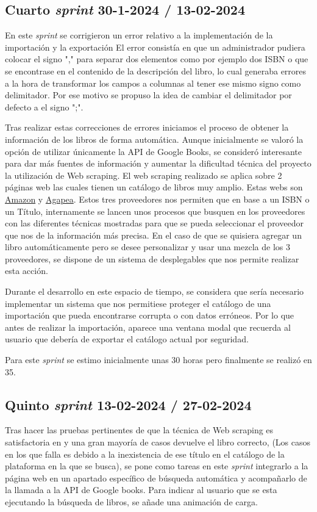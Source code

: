 \subsection{Cuarto \textit{sprint} 30-1-2024 / 13-02-2024}
En este \textit{sprint} se corrigieron un error relativo a la implementación de la importación y la exportación
El error consistía en que un administrador pudiera colocar el signo "," para separar dos elementos como por ejemplo dos ISBN o que se encontrase en el contenido de la descripción del libro, lo cual generaba errores a la hora de transformar los campos a columnas al tener ese mismo signo como delimitador. Por ese motivo se propuso la idea de cambiar el delimitador por defecto a el signo ";".

Tras realizar estas correcciones de errores iniciamos el proceso de obtener la información  de los libros de forma automática. Aunque inicialmente se valoró la opción de utilizar únicamente la API de Google Books,  se consideró interesante para  dar más fuentes de información y aumentar la dificultad técnica del proyecto la utilización de Web scraping. 
El  web scraping realizado se aplica sobre 2 páginas web las cuales tienen un catálogo de libros muy amplio. Estas webs son \href{https://www.amazon.es/}{Amazon} y \href{https://www.agapea.com/}{Agapea}. Estos tres proveedores nos permiten que en base a un ISBN o un Título, internamente se lancen unos procesos que busquen en los proveedores con las diferentes técnicas mostradas para que se pueda seleccionar el proveedor que nos de la información más precisa. 
En el caso de que se quisiera agregar un libro automáticamente pero se desee personalizar y usar una mezcla de los 3 proveedores, se dispone de un sistema de desplegables que nos permite realizar esta acción.

Durante el desarrollo en este espacio de tiempo, se considera que sería necesario implementar un sistema que nos permitiese proteger el catálogo de una importación que pueda encontrarse corrupta o con datos erróneos.
Por lo que antes de realizar la importación, aparece una ventana modal que recuerda al usuario que debería de exportar el catálogo actual por seguridad.

Para este \textit{sprint} se estimo inicialmente unas 30 horas pero finalmente se realizó en 35.

\subsection{Quinto \textit{sprint} 13-02-2024 / 27-02-2024}
Tras hacer las pruebas pertinentes de que la técnica de Web scraping es satisfactoria en y una gran mayoría de casos devuelve el libro correcto, (Los casos en los que falla es debido a la inexistencia de ese título en el catálogo de la plataforma en la que se busca), se pone como tareas en este \textit{sprint} integrarlo a la página web en un apartado específico de búsqueda automática y acompañarlo de la llamada a la API de Google books. Para indicar al usuario que se esta ejecutando la búsqueda de libros, se añade una animación de carga.

